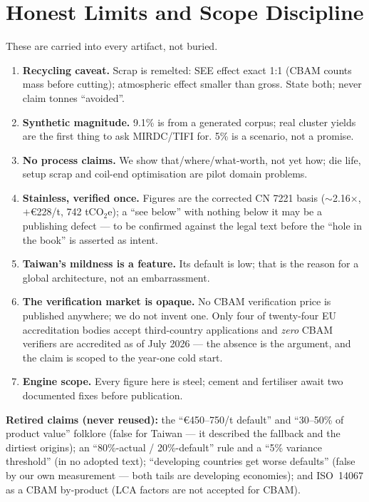 \documentclass[11pt,a4paper]{article}
\begin{document}
\section{Honest Limits and Scope Discipline}\label{sec:limits}
These are carried into every artifact, not buried.
\begin{enumerate}[leftmargin=1.3em,itemsep=1.5pt]
\item \textbf{Recycling caveat.} Scrap is remelted: SEE effect exact 1:1 (CBAM counts mass before cutting\cite{qa}); atmospheric effect smaller than gross. State both; never claim tonnes ``avoided''.
\item \textbf{Synthetic magnitude.} 9.1\% is from a generated corpus; real cluster yields are the first thing to ask MIRDC/TIFI for. 5\% is a scenario, not a promise.
\item \textbf{No process claims.} We show that/where/what-worth, not yet how; die life, setup scrap and coil-end optimisation are pilot domain problems.
\item \textbf{Stainless, verified once.} Figures are the corrected CN 7221 basis ($\sim$2.16$\times$, $+$€228/t, 742 tCO$_2$e); a ``see below'' with nothing below it may be a publishing defect --- to be confirmed against the legal text\cite{ir2621} before the ``hole in the book'' is asserted as intent.
\item \textbf{Taiwan's mildness is a feature.} Its default is low; that is the reason for a global architecture, not an embarrassment.
\item \textbf{The verification market is opaque.} No CBAM verification price is published anywhere; we do not invent one. Only four of twenty-four EU accreditation bodies accept third-country applications and \emph{zero} CBAM verifiers are accredited as of July 2026\cite{ecacc} --- the absence is the argument, and the claim is scoped to the year-one cold start.
\item \textbf{Engine scope.} Every figure here is steel; cement and fertiliser await two documented fixes before publication.
\end{enumerate}
\textbf{Retired claims (never reused):} the ``€450--750/t default'' and ``30--50\% of product value'' folklore (false for Taiwan --- it described the fallback and the dirtiest origins); an ``80\%-actual / 20\%-default'' rule and a ``5\% variance threshold'' (in no adopted text); ``developing countries get worse defaults'' (false by our own measurement --- both tails are developing economies); and ISO~14067 as a CBAM by-product (LCA factors are not accepted for CBAM\cite{qa}).
\end{document}
